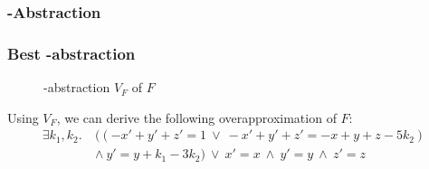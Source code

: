 \begin{frame}
	\frametitle{\qvasr-Abstraction}
\end{frame}

\begin{frame}[t]
	\frametitle{Best \qvasr-abstraction}
	\begin{center}
		\begin{figure}
			
			\caption*{\qvasr-abstraction $V_F$ of $F$}
		\end{figure}
	\end{center}
	\pause
	Using $V_F$, we can derive the following overapproximation of $F$:
	\begin{align*}
		\exists k_1, k_2.\ &((-x' + y' + z' = 1\ \lor\ -x' + y' + z' = -x + y + z - 5k_2)\ \\ &\land\ y' = y + k_1 - 3k_2)\ \lor\ x' = x\ \land\ y' = y\ \land\ z' = z
	\end{align*}
\end{frame}